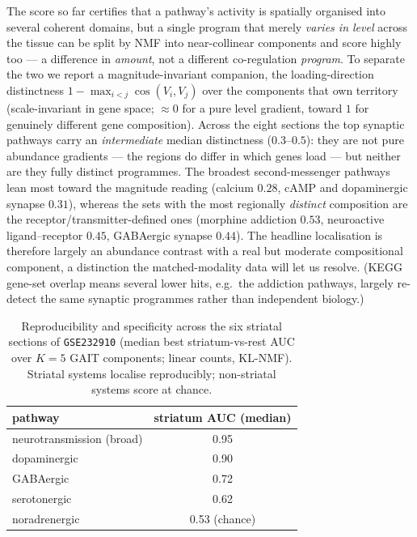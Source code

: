 \documentclass[11pt]{article}
\begin{document}
The score so far certifies that a pathway's activity is spatially organised into several
coherent domains, but a single program that merely \emph{varies in level} across the tissue can
be split by NMF into near-collinear components and score highly too --- a difference in
\emph{amount}, not a different co-regulation \emph{program}. To separate the two we report a
magnitude-invariant companion, the loading-direction distinctness
$1-\max_{i<j}\cos(V_i,V_j)$ over the components that own territory (scale-invariant in gene
space; $\approx 0$ for a pure level gradient, toward $1$ for genuinely different gene
composition). Across the eight sections the top synaptic pathways carry an
\emph{intermediate} median distinctness ($0.3$--$0.5$): they are not pure abundance gradients
--- the regions do differ in which genes load --- but neither are they fully distinct
programmes. The broadest second-messenger pathways lean most toward the magnitude reading
(calcium $0.28$, cAMP and dopaminergic synapse $0.31$), whereas the sets with the most
regionally \emph{distinct} composition are the receptor/transmitter-defined ones (morphine
addiction $0.53$, neuroactive ligand--receptor $0.45$, GABAergic synapse $0.44$). The headline
localisation is therefore largely an abundance contrast with a real but moderate compositional
component, a distinction the matched-modality data will let us resolve. (KEGG gene-set overlap means several lower
hits, e.g.\ the addiction pathways, largely re-detect the same synaptic programmes rather than
independent biology.)

\begin{table}[t]
  \centering
  \caption{Reproducibility and specificity across the six striatal sections of
  \texttt{GSE232910} (median best striatum-vs-rest AUC over $K=5$ GAIT components; linear
  counts, KL-NMF). Striatal systems localise reproducibly; non-striatal systems score at
  chance.}
  \label{tab:robustness}
  \begin{tabular}{lc}
    \toprule
    pathway & striatum AUC (median) \\
    \midrule
    neurotransmission (broad) & 0.95 \\
    dopaminergic              & 0.90 \\
    GABAergic                 & 0.72 \\
    serotonergic              & 0.62 \\
    noradrenergic             & 0.53 (chance) \\
    \bottomrule
  \end{tabular}
\end{table}
\end{document}
